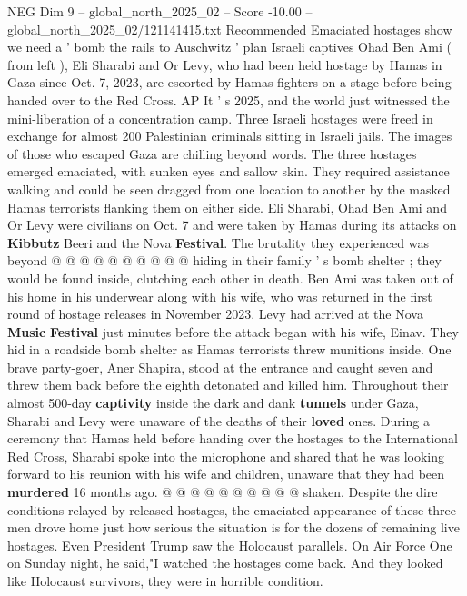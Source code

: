 \begin{textsample}{NEG Dim 9 – global\_north\_2025\_02 – Score -10.00 – global\_north\_2025\_02/121141415.txt}  \label{ex:f9_neg_055}
Recommended Emaciated hostages show we need a ' bomb the rails to Auschwitz ' plan Israeli captives Ohad Ben Ami ( from left ), Eli Sharabi and Or Levy, who had been held hostage by Hamas in Gaza since Oct. 7, 2023, are escorted by Hamas fighters on a stage before being handed over to the Red Cross.
AP It ' s 2025, and the world just witnessed the mini-liberation of a concentration camp.
Three Israeli hostages were freed in exchange for almost 200 Palestinian criminals sitting in Israeli jails.
The images of those who escaped Gaza are chilling beyond words.
The three hostages emerged emaciated, with sunken eyes and sallow skin.
They required assistance walking and could be seen dragged from one location to another by the masked Hamas terrorists flanking them on either side.
Eli Sharabi, Ohad Ben Ami and Or Levy were civilians on Oct. 7 and were taken by Hamas during its attacks on \textbf{Kibbutz} Beeri and the Nova \textbf{Festival}.
The brutality they experienced was beyond @ @ @ @ @ @ @ @ @ @ hiding in their family ' s bomb shelter ; they would be found inside, clutching each other in death.
Ben Ami was taken out of his home in his underwear along with his wife, who was returned in the first round of hostage releases in November 2023.
Levy had arrived at the Nova \textbf{Music} \textbf{Festival} just minutes before the attack began with his wife, Einav.
They hid in a roadside bomb shelter as Hamas terrorists threw munitions inside.
One brave party-goer, Aner Shapira, stood at the entrance and caught seven and threw them back before the eighth detonated and killed him.
Throughout their almost 500-day \textbf{captivity} inside the dark and dank \textbf{tunnels} under Gaza, Sharabi and Levy were unaware of the deaths of their \textbf{loved} ones.
During a ceremony that Hamas held before handing over the hostages to the International Red Cross, Sharabi spoke into the microphone and shared that he was looking forward to his reunion with his wife and children, unaware that they had been \textbf{murdered} 16 months ago. @ @ @ @ @ @ @ @ @ @ shaken.
Despite the dire conditions relayed by released hostages, the emaciated appearance of these three men drove home just how serious the situation is for the dozens of remaining live hostages.
Even President Trump saw the Holocaust parallels.
On Air Force One on Sunday night, he said,"I watched the hostages come back.
And they looked like Holocaust survivors, they were in horrible condition.

\end{textsample}

